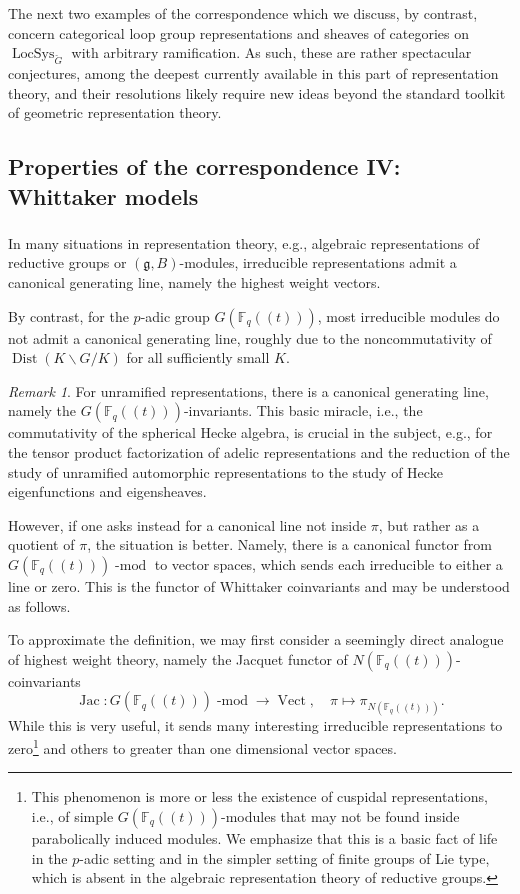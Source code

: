 \documentclass[10pt]{amsart}
\newcommand{\LS}{\on{LocSys}_{\cG}}
\newcommand{\Fqt}{\Fq(\!(t)\!)}
\newcommand{\fg}{\mathfrak{g}}
\newcommand{\on}{\operatorname}
\renewcommand{\mod}{\on{-mod}}
\newcommand{\Fq}{\mathbb{F}_q}
\theoremstyle{remark}
\newtheorem{re}[subsubsection]{Remark}
\numberwithin{equation}{section}
\newcommand{\cG}{\check{G}}
\renewcommand{\mod}{\operatorname{-mod}}
\begin{document}
	
The next two examples of the correspondence which we discuss, by contrast,
concern categorical loop group representations and sheaves of categories on 
$\LS$ with arbitrary ramification. As 
such, these are rather spectacular conjectures, among the deepest currently 
available in this part of
representation theory, and their resolutions likely require new ideas beyond 
the 
standard 
toolkit of geometric representation theory. 
	

\subsection{Properties of the correspondence IV: Whittaker models}
	
\subsubsection{} In many situations in representation theory, 
e.g., algebraic representations of reductive groups or $(\fg, B)$-modules, 
irreducible representations admit a canonical generating line, namely the 
highest weight vectors. 

By contrast, for the $p$-adic group $G(\Fqt)$, most irreducible modules do not 
admit a canonical generating line, roughly due to the noncommutativity of $\on{Dist}(K 
\backslash G / K)$ for all sufficiently small $K$. 

\begin{re} For unramified representations, there is a canonical generating 
line, namely the $G(\Fqt)$-invariants. This basic miracle, i.e., the 
commutativity of the spherical Hecke algebra, is crucial in the subject, e.g., 
for the tensor product factorization of adelic representations and the 
reduction of the study of unramified automorphic representations to the 
study of Hecke eigenfunctions and eigensheaves. \end{re}


 However, if one asks instead for a canonical line not inside  $\pi$, but rather 
 as a quotient of $\pi$, the situation is better. Namely, there is a canonical 
 functor from $G(\Fqt)\mod$ to vector spaces, which sends each irreducible to 
 either a line or zero. This is the functor of Whittaker coinvariants and may 
 be understood as follows. 
 
 To approximate the definition, we may first consider a seemingly direct
 analogue of highest weight theory, namely 
 the Jacquet functor of $N(\Fqt)$-coinvariants
 \[
       \on{Jac}: G(\Fqt)\mod \rightarrow \on{Vect}, \quad \pi \mapsto 
       \pi_{N(\Fqt)}. 
 \]
%
While this is very useful, it sends many interesting irreducible representations to 
zero\footnote{This phenomenon is more or less the existence of cuspidal 
representations, i.e., of simple $G(\Fqt)$-modules that may not be found 
inside parabolically induced modules. We emphasize that this is a basic fact of life 
in the $p$-adic setting and in the simpler setting of finite groups of Lie 
type, which is absent in the algebraic representation theory of reductive groups.} 
and others to greater than one dimensional vector spaces. 
\end{document}
